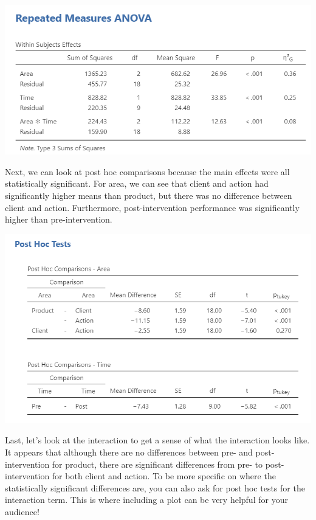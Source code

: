 \documentclass[
]{book}
\begin{document}
\includegraphics{images/06-factorial-anova/rm-factorial_results.png}

Next, we can look at post hoc comparisons because the main effects were all statistically significant. For area, we can see that client and action had significantly higher means than product, but there was no difference between client and action. Furthermore, post-intervention performance was significantly higher than pre-intervention.

\includegraphics{images/06-factorial-anova/rm-factorial_tukey.png}

Last, let's look at the interaction to get a sense of what the interaction looks like. It appears that although there are no differences between pre- and post-intervention for product, there are significant differences from pre- to post-intervention for both client and action. To be more specific on where the statistically significant differences are, you can also ask for post hoc tests for the interaction term. This is where including a plot can be very helpful for your audience!
\end{document}

